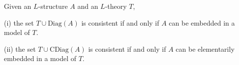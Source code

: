 Given an $L$-structure $A$ and an $L$-theory $T$,

(i) the set $T \cup \text{Diag}(A)$ is consistent if and only if $A$ can be embedded in a model of $T$.

(ii) the set $T \cup \text{CDiag}(A)$ is consistent if and only if $A$ can be elementarily embedded in a model of $T$.
